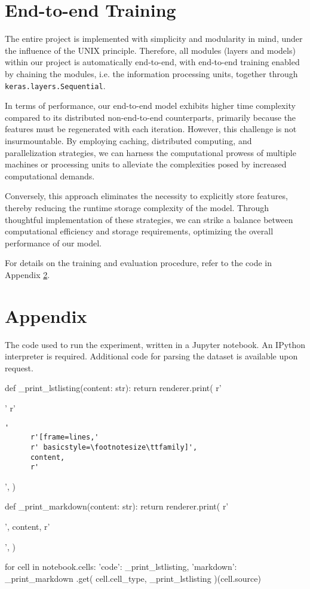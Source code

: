 \documentclass[letterpaper]{article} %
\begin{document}
\section{End-to-end Training}
The entire project is implemented with
simplicity and modularity in mind,
under the influence of the UNIX principle.
Therefore, all modules (layers and models)
within our project is automatically end-to-end,
with end-to-end training enabled by
chaining the modules, i.e. the information processing units,
together through \lstinline|keras.layers.Sequential|. 

In terms of performance, 
our end-to-end model exhibits higher time complexity compared to 
its distributed non-end-to-end counterparts, 
primarily because the features must be regenerated with each iteration. 
However, this challenge is not insurmountable. 
By employing caching, distributed computing, and parallelization strategies, 
we can harness the computational prowess of multiple machines 
or processing units to alleviate the complexities posed by 
increased computational demands.

Conversely, this approach eliminates the necessity to 
explicitly store features, thereby reducing the runtime storage complexity 
of the model. Through thoughtful implementation of these strategies, 
we can strike a balance between computational efficiency 
and storage requirements, optimizing the overall performance of our model.

For details on the training and evaluation procedure,
refer to the code in Appendix \ref{appendix:code}.




\appendix
\section{Appendix}\label{appendix:code}
The code used to run the experiment, written in a Jupyter notebook.
An IPython interpreter is required.
Additional code for parsing the dataset is available upon request.

\begin{python}
  def _print_lstlisting(content: str):
    return renderer.print(
      r'\par\noindent\ignorespaces'
      r'\begin{lstlisting}'
      r'[frame=lines,'
      r' basicstyle=\footnotesize\ttfamily]',
      content,
      r'\end{lstlisting}',
    )

  def _print_markdown(content: str):
    return renderer.print(
      r'\begin{markdown}',
      content,
      r'\end{markdown}',
    )

  for cell in notebook.cells:
    {
      'code': _print_lstlisting,
      'markdown': _print_markdown
    }.get(
      cell.cell_type,
      _print_lstlisting
    )(cell.source)
\end{python}
\end{document}
